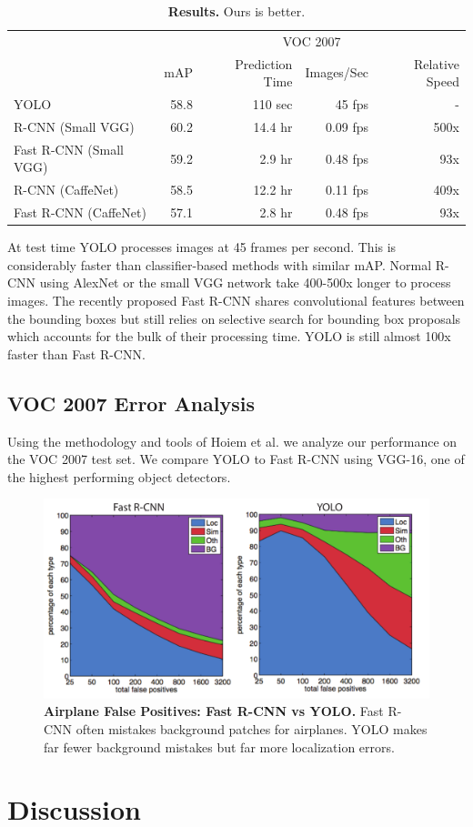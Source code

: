 \documentclass{article} %
\begin{document}
\begin{table}
\begin{center}
\begin{tabular}{l|r|r|r|r}
 & \multicolumn{4}{c}{VOC 2007}   \\
 & mAP & Prediction Time & Images/Sec  & Relative Speed\\
\hline
YOLO & 58.8 & 110 sec & 45 fps & - \\
R-CNN (Small VGG) & 60.2 & 14.4 hr & 0.09 fps & 500x \\
Fast R-CNN (Small VGG) & 59.2 & 2.9 hr & 0.48 fps & 93x \\
R-CNN (CaffeNet) & 58.5 & 12.2 hr & 0.11 fps & 409x \\
Fast R-CNN (CaffeNet) & 57.1 & 2.8 hr & 0.48 fps & 93x \\
\end{tabular}
\end{center}
\caption{\textbf{Results.} Ours is better.}
\end{table}


At test time YOLO processes images at 45 frames per second. This is considerably faster than classifier-based methods with similar mAP. Normal R-CNN using AlexNet or the small VGG network take 400-500x longer to process images. The recently proposed Fast R-CNN shares convolutional features between the bounding boxes but still relies on selective search for bounding box proposals which accounts for the bulk of their processing time. YOLO is still almost 100x faster than Fast R-CNN.

\subsection{VOC 2007 Error Analysis}
\label{error}

Using the methodology and tools of Hoiem et al. \cite{hoiem2012diagnosing} we analyze our performance on the VOC 2007 test set. We compare YOLO to Fast R-CNN using VGG-16, one of the highest performing object detectors.

   \begin{figure}[t]
      \centering
        \includegraphics[width=.7\linewidth]{compare}
      \caption{\textbf{Airplane False Positives: Fast R-CNN vs YOLO.} Fast R-CNN often mistakes background patches for airplanes. YOLO makes far fewer background mistakes but far more localization errors.}
      \label{compare}
   \end{figure}



\section{Discussion}

{\small


}
\end{document}
